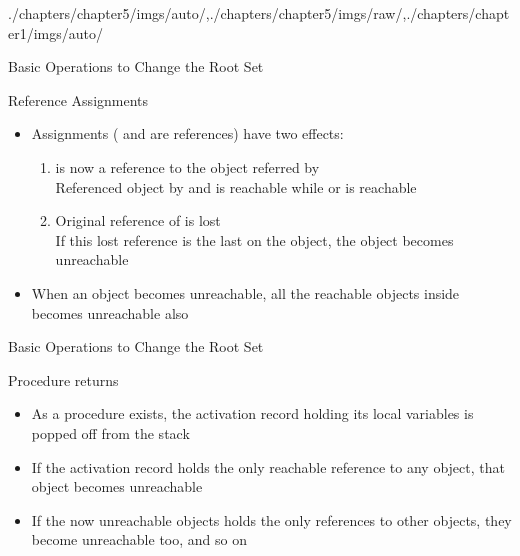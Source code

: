\begin{graphicspathcontext}{{./chapters/chapter5/imgs/auto/},{./chapters/chapter5/imgs/raw/},{./chapters/chapter1/imgs/auto/}}
\begin{bibunit}[apalike]
\begin{frame}{{Basic Operations} to Change the Root Set \insertcontinuationtext}
	\begin{block}{Reference Assignments}
		\begin{itemize}
			\item Assignments  ( and  are references) have two effects:
			\begin{enumerate}
				\item {} is now a reference to the object referred by  \\
				Referenced object by  and  is reachable while  or  is reachable
				\item Original reference of  is lost \\
				If this lost reference is the last on the object, the object becomes unreachable
			\end{enumerate}
			\item When an object becomes unreachable, all the reachable objects inside becomes unreachable also
		\end{itemize}
	\end{block}
\end{frame}

\begin{frame}{{Basic Operations} to Change the Root Set \insertcontinuationtext}
	\begin{block}{Procedure returns}
		\begin{itemize}
			\item As a procedure exists, the activation record holding its local variables is popped off from the stack
			\item If the activation record holds the only reachable reference to any object, that object becomes unreachable
			\item If the now unreachable objects holds the only references to other objects, they become unreachable too, and so on
		\end{itemize}
	\end{block}
\end{frame}


\end{bibunit}
\end{graphicspathcontext}
